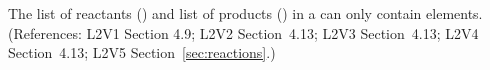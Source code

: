 The list of reactants () and list of products
() in a \Reaction can only contain
 elements.  (References: L2V1 Section 4.9; L2V2
Section~4.13; L2V3 Section~4.13; L2V4 Section~4.13; L2V5 Section~\ref{sec:reactions}.)
